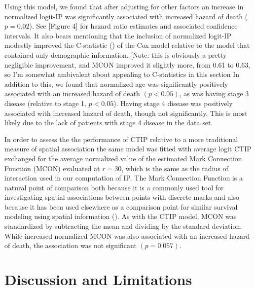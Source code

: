 \documentclass[
]{book}
\begin{document}
Using this model, we found that after adjusting for other
factors an increase in normalized logit-IP was significantly
associated with increased hazard of death (\(p = 0.02\)). See
{[}Figure 4{]} for hazard ratio estimates and associated confidence
intervals. It also bears mentioning that the inclusion of
normalized logit-IP modestly improved the C-statistic
(\cite{Uno11}) of the Cox model relative to the model that
contained only demographic information.
{[}Note: this is obviously a pretty negligible improvement, and MCON
improved it slightly more, from 0.61 to 0.63, so I'm somewhat
ambivalent about appealing to C-statistics in this section
In addition to this, we found that
normalized age was significantly positively associated with an
increased hazard of death \((p < 0.05)\), as was having stage 3
disease (relative to stage 1, \(p < 0.05\)). Having stage 4 disease
was positively associated with increased hazard of death, though
not significantly. This is most likely due to the lack of patients
with stage 4 disease in the data set.

In order to assess the the performance of CTIP relative to a more
traditional measure of spatial association the same model was
fitted with average logit CTIP exchanged for the average normalized
value of the estimated Mark Connection Function (MCON) evaluated at
\(r = 30\), which is the same as the radius of interaction used in
our computation of IP. The Mark Connection Function is a natural
point of comparison both because it is a commonly used tool for
investigating spatial associations between points with discrete
marks and also because it has been used elsewhere as a comparison
point for similar survival modeling using spatial information
(\citet{LiMIM19}). As with the CTIP model, MCON was standardized
by subtracting the mean and dividing by the standard deviation.
While increased normalized MCON was also associated with an
increased hazard of death, the association was not significant
\((p = 0.057)\).

\hypertarget{discussion-and-limitations}{%
\chapter{Discussion and Limitations}\label{discussion-and-limitations}}
\end{document}
